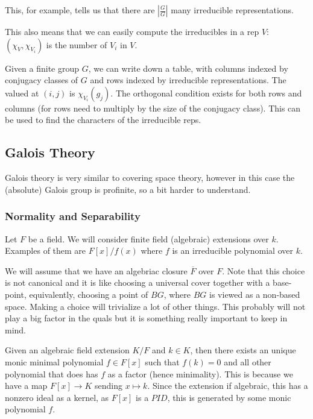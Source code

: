 \documentclass[main.tex]{subfiles}
\begin{document}
This, for example, tells us that there are $|\frac{G}{G}|$ many irreducible representations.

This also means that we can easily compute the irreducibles in a rep $V$: $(\chi_V, \chi_{V_i})$ is the number of $V_i$ in $V$.

Given a finite group $G$, we can write down a table, with columns indexed by conjugacy classes of $G$ and rows indexed by irreducible representations. The valued at $(i,j)$ is $\chi_{V_i}(g_j)$. The orthogonal condition exists for both rows and columns (for rows need to multiply by the size of the conjugacy class). This can be used to find the characters of the irreducible reps.




\subsection{Galois Theory}

Galois theory is very similar to covering space theory, however in this case the (absolute) Galois group is profinite, so a bit harder to understand. 

\subsubsection{Normality and Separability}


Let $F$ be a field. We will consider finite field (algebraic) extensions over $k$. Examples of them are  $F[x]/f(x)$ where $f$ is an irreducible polynomial over $k$. 
\begin{remark}
We will assume that we have an algebriac closure $\overline{F}$ over $F$. Note that this choice is not canonical and it is like choosing a universal cover together with a base-point, equivalently, choosing a point of $BG$, where $BG$ is viewed as a non-based space. Making a choice will trivialize a lot of other things. This probably will not play a big factor in the quals but it is something really important to keep in mind.
\end{remark}

Given an algebraic field extension $K/F$ and $k \in K$, then there exists an unique monic minimal polynomial $f \in F[x]$ such that $f(k) = 0$ and all other polynomial that does has $f$ as a factor (hence minimality). This is because we have a map $F[x] \rightarrow K$ sending $x \mapsto k$. Since the extension if algebraic, this has a nonzero ideal as a kernel, as $F[x]$ is a $PID$, this is generated by some monic polynomial $f$.
\end{document}
